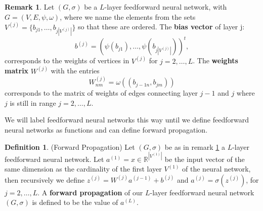 \documentclass{article}
\theoremstyle{definition}
\newtheorem{definition}[theorem]{Definition}
\newtheorem{remark}[theorem]{Remark}
\begin{document}
\begin{remark}\label{standardGraphLabeling}
Let $(G, \sigma)$ be a $L$-layer feedforward neural network, with $G=(V,E,\psi,\omega)$, where we name the elements from the sets $V^{(j)} = \{ b_{j1}, \dots ,b_{j|V^{(j)}|} \}$ so that these are ordered. The \textbf{bias vector} of layer j:
$$b^{(j)} = (\psi(b_{j1}), \dots ,\psi(b_{j|V^{(j)}|}))^{t},$$ 
corresponds to the weights of vertices in $V^{(j)}$ for $j = 2, \dots , L$. The \textbf{weights matrix} $W^{(j)}$ with the entries 
$$W^{(j)}_{nm} = \omega((b_{j-1n}, b_{jm}))$$ 
corresponds to the matrix of weights of edges connecting layer $j-1$ and $j$ where $j$ is still in range $j = 2, \dots , L$.
\end{remark}

We will label feedforward neural networks this way until we define feedforward neural networks as functions and can define forward propagation.

\begin{definition}(Forward Propagation)
\label{def:forward_propagation}
Let $(G, \sigma)$ be as in remark \ref{standardGraphLabeling} a $L$-layer feedforward neural network. Let $a^{(1)} = x \in \mathbb{R}^{|V^{(1)}|}$ be the input vector of the same dimension as the cardinality of the first layer $V^{(1)}$ of the neural network, then recursively we define $z^{(j)} = W^{(j)} a^{(j-1)} + b^{(j)}$ and $a^{(j)} = \sigma(z^{(j)})$, for $j=2, \dots , L$. A \textbf{forward propagation} of our $L$-layer feedforward neural network $(G, \sigma)$ is defined to be the value of $a^{(L)}$.
\end{definition}
\end{document}
